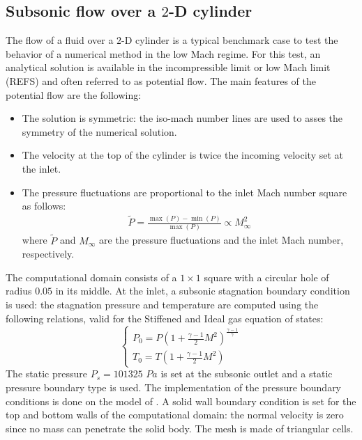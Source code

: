 \documentclass[preprint,10pt]{elsarticle}
\begin{document}
\subsection{Subsonic flow over a $2$-D cylinder} \label{sec:cylinder}
The flow of a fluid over a $2$-D cylinder is a typical benchmark case to test the behavior of a numerical method in the low Mach regime. For this test, an analytical solution is available in the incompressible limit or low Mach limit (REFS) and often referred to as potential flow. The main features of the potential flow are the following:
\begin{itemize}
\item The solution is symmetric: the iso-mach number lines are used to asses the symmetry of the numerical solution.
\item The velocity at the top of the cylinder is twice the incoming velocity set at the inlet.
\item The pressure fluctuations are proportional to the inlet Mach number square as follows: 
\begin{eqnarray}
\tilde{P} = \frac{\max(P) - \min(P)}{\max(P)}  \propto M_{\infty}^2\nonumber
\end{eqnarray}
where $\tilde{P}$ and $M_{\infty}$ are the pressure fluctuations and the inlet Mach number, respectively.
\end{itemize}
The computational domain consists of a $1\times 1$ square with a circular hole of radius $0.05$ in its middle. At the inlet, a subsonic stagnation boundary condition is used: the stagnation pressure and temperature are computed using the following relations, valid for the Stiffened and Ideal gas equation of states:
\begin{equation}
\label{eq:stagnation_relations}
\left\{
\begin{array}{l}
P_0 = P\left( 1 + \frac{\gamma-1}{2} M^2 \right)^{\frac{\gamma-1}{\gamma}} \\
T_0 = T\left( 1 + \frac{\gamma-1}{2} M^2 \right)
\end{array}
\right.
\end{equation}
The static pressure $P_s = 101325$ $Pa$ is set at the subsonic outlet and a static pressure boundary type is used. The implementation of the pressure boundary conditions is done on the model of \cite{SEM}. A solid wall boundary condition is set for the top and bottom walls of the computational domain: the normal velocity is zero since no mass can penetrate the solid body. The mesh is made of triangular cells.\\
\end{document}
